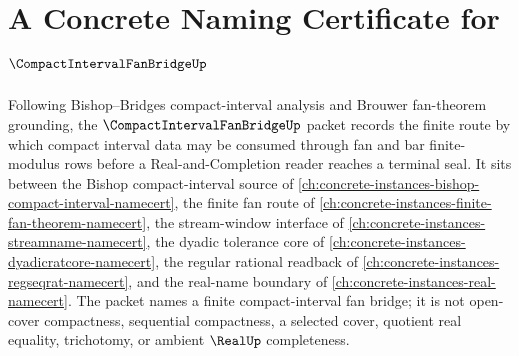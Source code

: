 \chapter{A Concrete Naming Certificate for $\CompactIntervalFanBridgeUp$}
\label{ch:concrete-instances-compact-interval-fan-bridge-namecert}

Following Bishop--Bridges compact-interval analysis and Brouwer fan-theorem grounding, the $\CompactIntervalFanBridgeUp$ packet records the finite route by which compact interval data may be consumed through fan and bar finite-modulus rows before a Real-and-Completion reader reaches a terminal seal. It sits between the Bishop compact-interval source of \autoref{ch:concrete-instances-bishop-compact-interval-namecert}, the finite fan route of \autoref{ch:concrete-instances-finite-fan-theorem-namecert}, the stream-window interface of \autoref{ch:concrete-instances-streamname-namecert}, the dyadic tolerance core of \autoref{ch:concrete-instances-dyadicratcore-namecert}, the regular rational readback of \autoref{ch:concrete-instances-regseqrat-namecert}, and the real-name boundary of \autoref{ch:concrete-instances-real-namecert}. The packet names a finite compact-interval fan bridge; it is not open-cover compactness, sequential compactness, a selected cover, quotient real equality, trichotomy, or ambient $\RealUp$ completeness.

